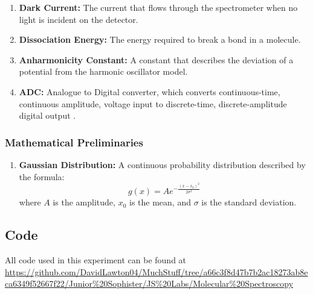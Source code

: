 \documentclass{article}
\begin{document}
\begin{enumerate}
    \item \label{kew: DarkCurrent}\textbf{Dark Current:} The current that flows through the spectrometer when no light is incident on the detector.
    
    \item \textbf{Dissociation Energy:} The energy required to break a bond in a molecule.
    
    \item \textbf{Anharmonicity Constant:} A constant that describes the deviation of a potential from the harmonic oscillator model.
    
    \item \label{kew: ADC}\textbf{ADC:} Analogue to Digital converter, which converts continuous-time, continuous amplitude, voltage input to discrete-time, discrete-amplitude digital output \cite{enwiki:1248045950}.
    
\end{enumerate}
\subsubsection{Mathematical Preliminaries}
\begin{enumerate}
    \item \textbf{Gaussian Distribution:} A continuous probability distribution described by the formula:
    \begin{equation}
        g(x) = Ae^{-\frac{(x-x_0)^2}{2\sigma^2}}
    \end{equation}
    where $A$ is the amplitude, $x_0$ is the mean, and $\sigma$ is the standard deviation.
\end{enumerate}
\subsection{Code}\label{sec:code}
All code used in this experiment can be found at \url{https://github.com/DavidLawton04/MuchStuff/tree/a66c3f8d47b7b2ac18273ab8eca6349f52667f22/Junior%20Sophister/JS%20Labs/Molecular%20Spectroscopy}






\end{document}
